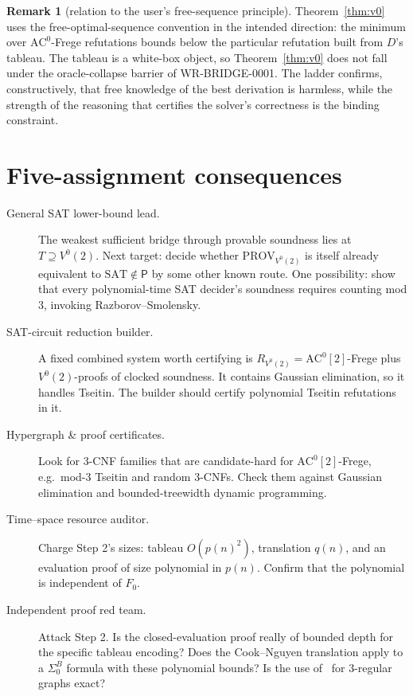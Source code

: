\documentclass[11pt]{article}
\theoremstyle{definition}
\newtheorem{remark}[theorem]{Remark}
\newcommand{\SAT}{\mathrm{SAT}}
\begin{document}
\begin{remark}[relation to the user's free-sequence principle]
Theorem~\ref{thm:v0} uses the free-optimal-sequence convention in the intended direction: the minimum over
$\mathrm{AC}^0$-Frege refutations bounds below the particular refutation built from $D$'s tableau. The tableau
is a white-box object, so Theorem~\ref{thm:v0} does not fall under the oracle-collapse barrier of
WR-BRIDGE-0001. The ladder confirms, constructively, that free knowledge of the best derivation is harmless,
while the strength of the reasoning that certifies the solver's correctness is the binding constraint.
\end{remark}

\section{Five-assignment consequences}
\begin{description}
\item[General SAT lower-bound lead.] The weakest sufficient bridge through provable soundness lies at
$T\supseteq V^0(2)$. Next target: decide whether $\mathrm{PROV}_{V^0(2)}$ is itself already equivalent to
$\SAT\notin\mathsf P$ by some other known route. One possibility: show that every polynomial-time
SAT decider's soundness requires counting mod 3, invoking Razborov--Smolensky.
\item[SAT-circuit reduction builder.] A fixed combined system worth certifying is
$R_{V^0(2)}=\mathrm{AC}^0[2]$-Frege plus $V^0(2)$-proofs of clocked soundness. It contains Gaussian elimination,
so it handles Tseitin. The builder should certify polynomial Tseitin refutations in it.
\item[Hypergraph \& proof certificates.] Look for 3-CNF families that are candidate-hard for
$\mathrm{AC}^0[2]$-Frege, e.g.\ mod-3 Tseitin and random 3-CNFs. Check them against Gaussian elimination
and bounded-treewidth dynamic programming.
\item[Time--space resource auditor.] Charge Step 2's sizes: tableau $O(p(n)^2)$, translation
$q(n)$, and an evaluation proof of size polynomial in $p(n)$. Confirm that the polynomial is independent of $F_0$.
\item[Independent proof red team.] Attack Step 2. Is the closed-evaluation proof really of bounded depth for the
specific tableau encoding? Does the Cook--Nguyen translation apply to a $\Sigma^B_0$ formula with these
polynomial bounds? Is the use of~\cite{BS02} for 3-regular graphs exact?
\end{description}
\end{document}
